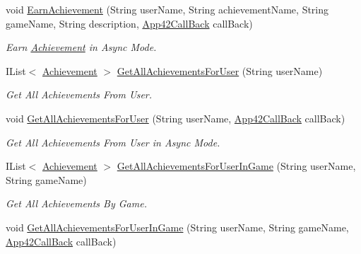 \begin{DoxyCompactItemize}
void \hyperlink{classcom_1_1shephertz_1_1app42_1_1paas_1_1sdk_1_1csharp_1_1achievement_1_1_achievement_service_ab780775f471a6ac50605090d43a6c452}{Earn\+Achievement} (String user\+Name, String achievement\+Name, String game\+Name, String description, \hyperlink{interfacecom_1_1shephertz_1_1app42_1_1paas_1_1sdk_1_1csharp_1_1_app42_call_back}{App42\+Call\+Back} call\+Back)
\begin{DoxyCompactList}\small\item\em Earn \hyperlink{classcom_1_1shephertz_1_1app42_1_1paas_1_1sdk_1_1csharp_1_1achievement_1_1_achievement}{Achievement} in Async Mode. \end{DoxyCompactList}\item 
I\+List$<$ \hyperlink{classcom_1_1shephertz_1_1app42_1_1paas_1_1sdk_1_1csharp_1_1achievement_1_1_achievement}{Achievement} $>$ \hyperlink{classcom_1_1shephertz_1_1app42_1_1paas_1_1sdk_1_1csharp_1_1achievement_1_1_achievement_service_a1fc9819af270d6e7adb8d58c9de0d46d}{Get\+All\+Achievements\+For\+User} (String user\+Name)
\begin{DoxyCompactList}\small\item\em Get All Achievements From User. \end{DoxyCompactList}\item 
void \hyperlink{classcom_1_1shephertz_1_1app42_1_1paas_1_1sdk_1_1csharp_1_1achievement_1_1_achievement_service_aec6ac7dc08157f05527922fdca7ad3c0}{Get\+All\+Achievements\+For\+User} (String user\+Name, \hyperlink{interfacecom_1_1shephertz_1_1app42_1_1paas_1_1sdk_1_1csharp_1_1_app42_call_back}{App42\+Call\+Back} call\+Back)
\begin{DoxyCompactList}\small\item\em Get All Achievements From User in Async Mode. \end{DoxyCompactList}\item 
I\+List$<$ \hyperlink{classcom_1_1shephertz_1_1app42_1_1paas_1_1sdk_1_1csharp_1_1achievement_1_1_achievement}{Achievement} $>$ \hyperlink{classcom_1_1shephertz_1_1app42_1_1paas_1_1sdk_1_1csharp_1_1achievement_1_1_achievement_service_a245fcc98f387b3eca3ec1ff271a1fc70}{Get\+All\+Achievements\+For\+User\+In\+Game} (String user\+Name, String game\+Name)
\begin{DoxyCompactList}\small\item\em Get All Achievements By Game. \end{DoxyCompactList}\item 
void \hyperlink{classcom_1_1shephertz_1_1app42_1_1paas_1_1sdk_1_1csharp_1_1achievement_1_1_achievement_service_a37c641a3019b41da497c72f6febdd8f3}{Get\+All\+Achievements\+For\+User\+In\+Game} (String user\+Name, String game\+Name, \hyperlink{interfacecom_1_1shephertz_1_1app42_1_1paas_1_1sdk_1_1csharp_1_1_app42_call_back}{App42\+Call\+Back} call\+Back)

\end{DoxyCompactItemize}
